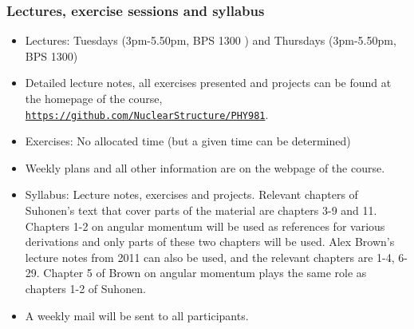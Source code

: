 \documentclass{beamer}
\begin{document}
\begin{frame}
\frametitle{Lectures, exercise sessions and syllabus}

\begin{block}{}
\begin{itemize}
\item Lectures: Tuesdays (3pm-5.50pm, BPS 1300 ) and Thursdays (3pm-5.50pm, BPS 1300)

\item Detailed lecture notes, all exercises presented and projects can be found at the homepage of the course, \href{{https://github.com/NuclearStructure/PHY981}}{\nolinkurl{https://github.com/NuclearStructure/PHY981}}.

\item Exercises: No allocated time (but a given time can be determined)

\item Weekly plans and all other information are on the webpage of the course.

\item Syllabus: Lecture notes, exercises and projects. Relevant chapters of Suhonen's text that cover parts of the material are chapters 3-9 and 11. Chapters 1-2 on angular momentum will be used as references for various derivations and only parts of these two chapters will be used. Alex Brown's lecture notes from 2011 can also be used, and the relevant chapters are 1-4, 6-29. Chapter 5 of Brown on angular momentum plays the same role as chapters 1-2 of Suhonen. 

\item A weekly mail will be sent to all participants. 
\end{itemize}

\noindent
\end{block}
\end{frame}
\end{document}
